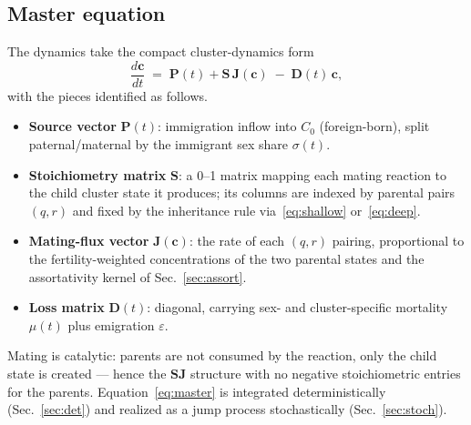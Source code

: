\documentclass[11pt,a4paper]{article}
\begin{document}
\subsection{Master equation}
\label{sec:master}
The dynamics take the compact cluster-dynamics form
\begin{equation}
  \frac{d\mathbf{c}}{dt} \;=\; \mathbf{P}(t) + \mathbf{S}\,\mathbf{J}(\mathbf{c})
  \;-\; \mathbf{D}(t)\,\mathbf{c},
  \label{eq:master}
\end{equation}
with the pieces identified as follows.
\begin{itemize}[leftmargin=1.4em]
  \item \textbf{Source vector} $\mathbf{P}(t)$: immigration inflow into
  $C_0$ (foreign-born), split paternal/maternal by the immigrant sex
  share $\sigma(t)$.
  \item \textbf{Stoichiometry matrix} $\mathbf{S}$: a 0--1 matrix
  mapping each mating reaction to the child cluster state it produces;
  its columns are indexed by parental pairs $(q,r)$ and fixed by the
  inheritance rule via~\eqref{eq:shallow} or~\eqref{eq:deep}.
  \item \textbf{Mating-flux vector} $\mathbf{J}(\mathbf{c})$: the rate
  of each $(q,r)$ pairing, proportional to the fertility-weighted
  concentrations of the two parental states and the assortativity
  kernel of Sec.~\ref{sec:assort}.
  \item \textbf{Loss matrix} $\mathbf{D}(t)$: diagonal, carrying
  sex- and cluster-specific mortality $\mu(t)$ plus emigration
  $\varepsilon$.
\end{itemize}
Mating is catalytic: parents are not consumed by the reaction, only the
child state is created --- hence the $\mathbf{SJ}$ structure with no
negative stoichiometric entries for the parents.  Equation~\eqref{eq:master}
is integrated deterministically (Sec.~\ref{sec:det}) and realized as a
jump process stochastically (Sec.~\ref{sec:stoch}).
\end{document}
